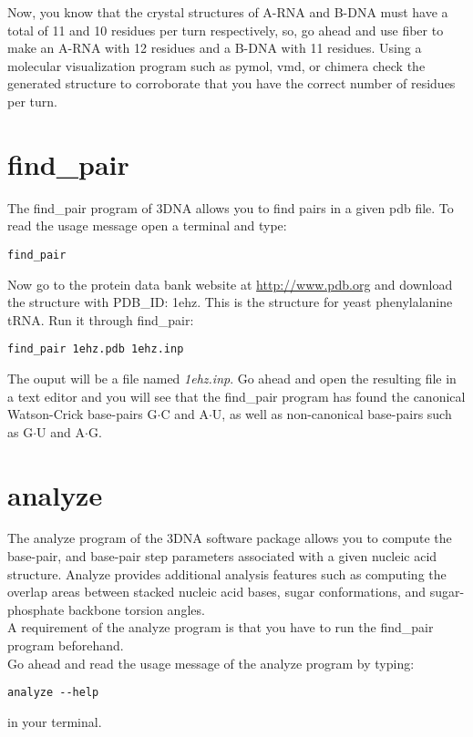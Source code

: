 \documentclass[10pt, oneside, pdftex]{article}
\begin{document}
\noindent Now, you know that the crystal structures of A-RNA and B-DNA
must have a total of 11  and 10 residues per turn respectively, so, go
ahead and use  \textrm{fiber} to make an A-RNA with  12 residues and a
B-DNA with 11 residues.   Using a molecular visualization program such
as pymol, vmd, or chimera check the generated structure to corroborate
that you have the correct number of residues per turn.

\section{find\_pair}
The \textrm{find\_pair} program of 3DNA  allows you to find pairs in a
given pdb file.
To read the usage message open a terminal and type:
\begin{Verbatim}
find_pair
\end{Verbatim} 
Now go  to the protein data bank website  at \url{http://www.pdb.org}
and download the  structure with PDB\_ID: 1ehz. This  is the structure
for yeast phenylalanine tRNA. 
Run it through \textrm{find\_pair}:
\begin{Verbatim}
find_pair 1ehz.pdb 1ehz.inp
\end{Verbatim}
The ouput  will be a file  named \textit{1ehz.inp}. Go  ahead and open
the  resulting  file in  a  text  editor and  you  will  see that  the
\textrm{find\_pair}  program  has  found  the  canonical  Watson-Crick
base-pairs   G$\cdot$C  and  A$\cdot$U,   as  well   as  non-canonical
base-pairs such as G$\cdot$U and A$\cdot$G.

\section{analyze}
The \textrm{analyze} program  of the 3DNA software  package allows you
to  compute the  base-pair, and  base-pair step  parameters associated
with  a  given nucleic  acid  structure.  Analyze provides  additional
analysis features such as computing  the overlap areas between stacked
nucleic acid bases, sugar  conformations, and sugar-phosphate backbone
torsion angles.\\
A requirement of the \textrm{analyze} program  is that you have to run
the \textrm{find\_pair} program beforehand.\\
Go ahead and read the usage message of the analyze program by typing:
\begin{Verbatim}
analyze --help
\end{Verbatim}
in your terminal.\\
\end{document}
